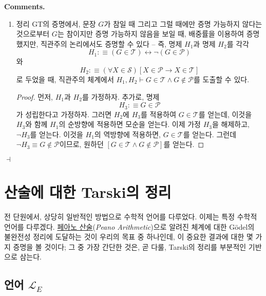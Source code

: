 \documentclass[12pt]{paper}
\newenvironment{context}[1][]
{ \noindent \textbf{{#1}.}
}
{ \hfill $ \dashv $
}
\begin{document}
  \begin{context}[Comments]
    \begin{enumerate}
      \item 정리 GT의 증명에서,
      문장 $G$가 참일 때 그리고 그럴 때에만 증명 가능하지 않다는 것으로부터 $G$는 참이지만 증명 가능하지 않음을 보일 때,
      배중률을 이용하여 증명했지만, 직관주의 논리에서도 증명할 수 있다 --
      즉, 명제 $H_{1}$과 명제 $H_{2}$를 각각
      $$H_{1} : \equiv \left( G \in \mathcal{T} \right) \leftrightarrow \lnot \left( G \in \mathcal{P} \right) $$와
      $$ H_{2} : \equiv \left( \forall X \in \mathcal{S} \right) \left[ X \in \mathcal{P} \rightarrow X \in \mathcal{T} \right]$$로
      두었을 때,
      직관주의 체계에서 $H_{1} , H_{2} \vdash G \in \mathcal{T} \land G \notin \mathcal{P}$를 도출할 수 있다.

      \begin{proof}
        먼저, $H_{1}$과 $H_{2}$를 가정하자.
        추가로, 명제 $$H_{3} : \equiv G \in \mathcal{P}$$가 성립한다고 가정하자.
        그러면 $H_{2}$에 $H_{3}$를 적용하여 $G \in \mathcal{T}$를 얻는데,
        이것을 $H_{3}$와 함께 $H_{1}$의 순방향에 적용하면 모순을 얻는다.
        이제 가정 $H_{3}$을 해제하고, $\lnot H_{3}$를 얻는다.
        이것을 $H_{1}$의 역방향에 적용하면, $G \in \mathcal{T}$를 얻는다.
        그런데 $\lnot H_{3} \equiv G \notin \mathcal{P}$이므로,
        원하던 $\left[ G \in \mathcal{T} \land G \notin \mathcal{P} \right]$를 얻는다.
      \end{proof}
    \end{enumerate}
  \end{context}

  \section{산술에 대한 Tarski의 정리}
  \hspace{12pt}

  전 단원에서, 상당히 일반적인 방법으로 수학적 언어를 다루었다.
  이제는 특정 수학적 언어를 다루겠다.
  \underline{페아노 산술}(\textit{Peano Arithmetic})으로 알려진 체계에 대한
  G\"odel의 불완전성 정리에 도달하는 것이 우리의 목표 중 하나인데,
  이 중요한 결과에 대한 몇 가지 증명을 볼 것이다;
  그 중 가장 간단한 것은, 곧 다룰, Tarski의 정리를 부분적인 기반으로 삼는다.

  \subsection{언어 $\mathcal{L}_{E}$}
  \hspace{12pt}
\end{document}

